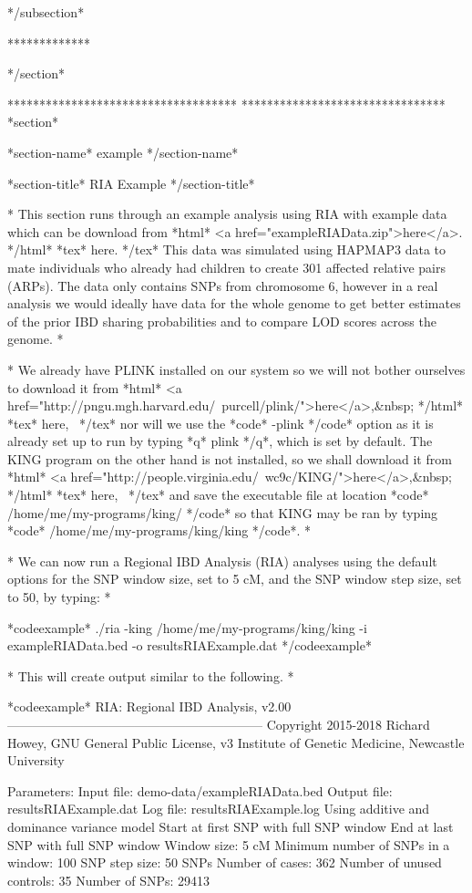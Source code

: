 */subsection*

*************

*/section*

************************************
********************************
*section*

*section-name*
example
*/section-name*

*section-title*
RIA Example
*/section-title*

*
This section runs through an example analysis using RIA with example data which can be download from *html* <a href="exampleRIAData.zip">here</a>. */html* *tex* here. */tex* This data was simulated using HAPMAP3 data to mate individuals who already had children to create 301 affected relative pairs (ARPs). The data only contains SNPs from chromosome 6, however in a real analysis we would ideally have data for the whole genome to get better estimates of the prior IBD sharing probabilities and to compare LOD scores across the genome.
*

*
We already have PLINK installed on our system so we will not bother ourselves to download it from *html* <a href="http://pngu.mgh.harvard.edu/~purcell/plink/">here</a>,&nbsp; */html* *tex* here,~ */tex* nor will we use the *code* -plink */code* option as it is already set up to run by typing *q* plink */q*, which is set by default. The KING program on the other hand is not installed, so we shall download it from *html* <a href="http://people.virginia.edu/~wc9c/KING/">here</a>,&nbsp; */html* *tex* here,~ */tex* and save the executable file at location *code* /home/me/my-programs/king/ */code* so that KING may be ran by typing *code* /home/me/my-programs/king/king */code*.
*

*
We can now run a Regional IBD Analysis (RIA) analyses using the default options for the SNP window size, set to 5 cM, and the SNP window step size, set to 50, by typing:
*

*codeexample*
./ria -king /home/me/my-programs/king/king -i exampleRIAData.bed -o resultsRIAExample.dat
*/codeexample*

*
This will create output similar to the following.
*

*codeexample*
RIA: Regional IBD Analysis, v2.00
------------------------------------------------------------
Copyright 2015-2018 Richard Howey, GNU General Public License, v3
Institute of Genetic Medicine, Newcastle University

Parameters:
Input file: demo-data/exampleRIAData.bed
Output file: resultsRIAExample.dat
Log file: resultsRIAExample.log
Using additive and dominance variance model
Start at first SNP with full SNP window
End at last SNP with full SNP window
Window size: 5 cM
Minimum number of SNPs in a window: 100
SNP step size: 50 SNPs
Number of cases: 362
Number of unused controls: 35
Number of SNPs: 29413

